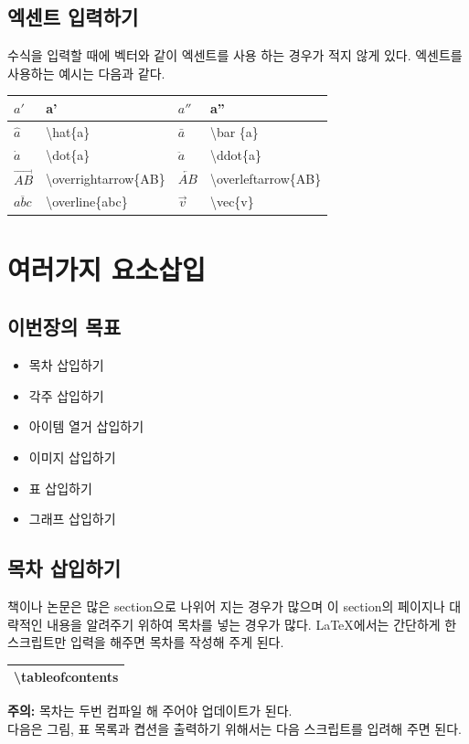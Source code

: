 \documentclass[12pt]{article}
\begin{document}
	\subsection{엑센트 입력하기}
	수식을 입력할 때에 벡터와 같이 엑센트를 사용 하는 경우가 적지 않게 있다. 엑센트를 사용하는 예시는 다음과 같다.\newline
	
	\begin{tabularx}{\textwidth \onehalfspacing}{|l|X||l|X|}
		\hline
		\(a'\) & a' & \(a''\) & a''\\
		\hline
		\(\hat{a} \) & \textbackslash hat\{a\} & \(\bar{a} \) & \textbackslash bar \{a\}\\
		\hline
		\(\dot{a}\) & \textbackslash dot\{a\} & \(\ddot{a}\) &\textbackslash ddot\{a\}\\
		\hline
		\(\overrightarrow{AB}\) & \textbackslash overrightarrow\{AB\} & \(\overleftarrow{AB}\) & \textbackslash overleftarrow\{AB\}\\
		\hline
		\(\overline{abc}\) & \textbackslash overline\{abc\}& \(\vec{v}\) & \textbackslash vec\{v\} \\
		\hline
	\end{tabularx} 
	\clearpage
	\section{여러가지 요소삽입}
	\subsection{이번장의 목표}
	\begin{itemize}
		\item 목차 삽입하기
		\item 각주 삽입하기
		\item 아이템 열거 삽입하기
		\item 이미지 삽입하기
		\item 표 삽입하기
		\item 그래프 삽입하기
	\end{itemize}
	\subsection{목차 삽입하기}
	책이나 논문은 많은 section으로 나위어 지는 경우가 많으며 이 section의 페이지나 대략적인 내용을 알려주기 위하여 목차를 넣는 경우가 많다. \LaTeX 에서는 간단하게 한 스크립트만 입력을 해주면 목차를 작성해 주게 된다.\newline
	
	\begin{tabularx}{\textwidth \onehalfspacing}{|X|}
		\hline
		\textbackslash tableofcontents\\
		\hline
	\end{tabularx}
	\newline\newline
	\textbf{주의: }목차는 두번 컴파일 해 주어야 업데이트가 된다.\\
	다음은 그림, 표 목록과 켭션을 출력하기 위해서는 다음 스크립트를 입려해 주면 된다.\newline
	
\end{document}
